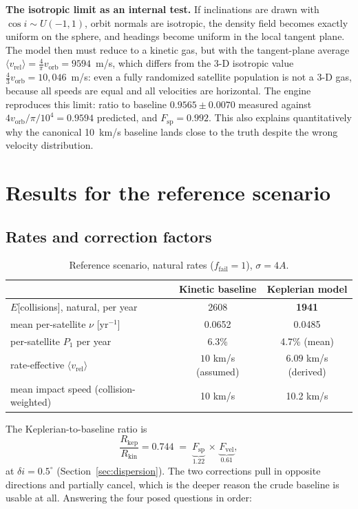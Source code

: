 \documentclass[11pt,a4paper]{article}
\newcommand{\vrel}{v_{\mathrm{rel}}}
\newcommand{\vorb}{v_{\mathrm{orb}}}
\begin{document}
\textbf{The isotropic limit as an internal test.} If inclinations are drawn with
$\cos i \sim U(-1,1)$, orbit normals are isotropic, the density field becomes exactly
uniform on the sphere, and headings become uniform in the local tangent plane. The
model then must reduce to a kinetic gas, but with the tangent-plane average
$\langle \vrel\rangle = \frac{4}{\pi}\vorb = 9594$~m/s, which differs from the 3-D
isotropic value $\frac{4}{3}\vorb = 10{,}046$~m/s: even a fully randomized satellite
population is not a 3-D gas, because all speeds are equal and all velocities are
horizontal. The engine reproduces this limit: ratio to baseline $0.9565 \pm 0.0070$
measured against $4\vorb/\pi/10^4 = 0.9594$ predicted, and $F_{\mathrm{sp}} = 0.992$.
This also explains quantitatively why the canonical 10~km/s baseline lands close to
the truth despite the wrong velocity distribution.

\section{Results for the reference scenario}

\subsection{Rates and correction factors}

\begin{table}[h]\centering\small
\begin{tabular}{lcc}
\toprule
 & Kinetic baseline & Keplerian model \\
\midrule
$E$[collisions], natural, per year & 2608 & \textbf{1941} \\
mean per-satellite $\nu$ [yr$^{-1}$] & 0.0652 & 0.0485 \\
per-satellite $P_1$ per year & 6.3\% & 4.7\% (mean) \\
rate-effective $\langle\vrel\rangle$ & $10$ km/s (assumed) & $6.09$ km/s (derived) \\
mean impact speed (collision-weighted) & 10 km/s & 10.2 km/s \\
\bottomrule
\end{tabular}
\caption{Reference scenario, natural rates ($f_{\mathrm{fail}} = 1$), $\sigma = 4A$.}
\label{tab:main}
\end{table}

The Keplerian-to-baseline ratio is
\begin{equation}
\frac{R_{\mathrm{kep}}}{R_{\mathrm{kin}}} = 0.744
\;=\; \underbrace{F_{\mathrm{sp}}}_{1.22}\,\times\,\underbrace{F_{\mathrm{vel}}}_{0.61},
\end{equation}
at $\delta i = 0.5^\circ$ (Section~\ref{sec:dispersion}). The two corrections pull in
opposite directions and partially cancel, which is the deeper reason the crude
baseline is usable at all. Answering the four posed questions in order:
\end{document}
